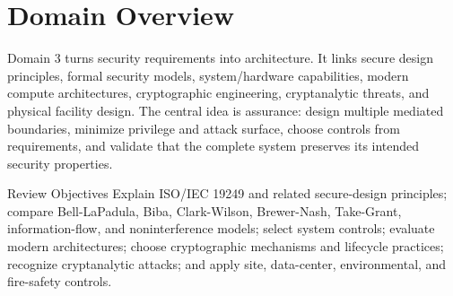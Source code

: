 \documentclass[10pt,letterpaper]{article}
\title{\CornellDocumentTitle}
\author{Arthur Deane and Aaron Kraus}
\date{\today}
\begin{document}
\maketitle

\section*{Domain Overview}
Domain 3 turns security requirements into architecture. It links secure design principles, formal security models, system/hardware capabilities, modern compute architectures, cryptographic engineering, cryptanalytic threats, and physical facility design. The central idea is assurance: design multiple mediated boundaries, minimize privilege and attack surface, choose controls from requirements, and validate that the complete system preserves its intended security properties.

\begin{summarybox}{Review Objectives}
Explain ISO/IEC 19249 and related secure-design principles; compare Bell-LaPadula, Biba, Clark-Wilson, Brewer-Nash, Take-Grant, information-flow, and noninterference models; select system controls; evaluate modern architectures; choose cryptographic mechanisms and lifecycle practices; recognize cryptanalytic attacks; and apply site, data-center, environmental, and fire-safety controls.
\end{summarybox}
\end{document}

